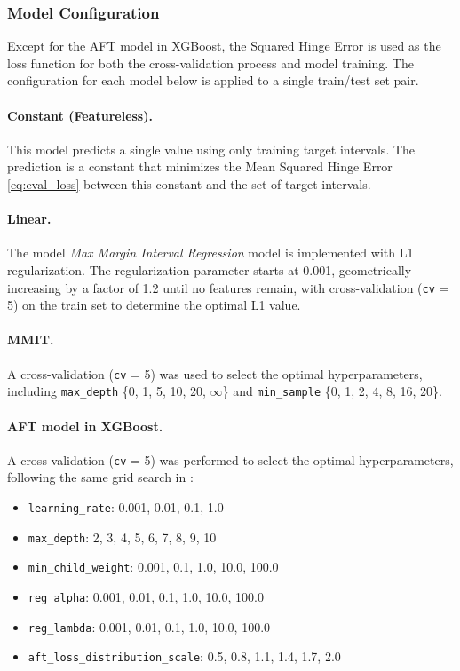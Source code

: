 \documentclass[12pt]{article}
\begin{document}
\subsubsection{Model Configuration}
Except for the AFT model in XGBoost, the Squared Hinge Error is used as the loss function for both the cross-validation process and model training.
The configuration for each model below is applied to a single train/test set pair.
\paragraph{Constant (Featureless).} 
This model predicts a single value using only training target intervals.
The prediction is a constant that minimizes the Mean Squared Hinge Error \eqref{eq:eval_loss} between this constant and the set of target intervals.
\paragraph{Linear.} 
The model \textit{Max Margin Interval Regression} model is implemented with L1 regularization.
The regularization parameter starts at 0.001, geometrically increasing by a factor of 1.2 until no features remain, with cross-validation (\texttt{cv} = 5) on the train set to determine the optimal L1 value.
\paragraph{MMIT.}  
A cross-validation (\texttt{cv} = 5) was used to select the optimal hyperparameters, including \texttt{max\_depth} \{0, 1, 5, 10, 20, \(\infty\)\} and \texttt{min\_sample} \{0, 1, 2, 4, 8, 16, 20\}.
\paragraph{AFT model in XGBoost.}
A cross-validation (\texttt{cv} = 5) was performed to select the optimal hyperparameters, following the same grid search in \citet{aft_xgboost}:
\begin{itemize}
    \item \texttt{learning\_rate}: 0.001, 0.01, 0.1, 1.0
    \item \texttt{max\_depth}: 2, 3, 4, 5, 6, 7, 8, 9, 10
    \item \texttt{min\_child\_weight}: 0.001, 0.1, 1.0, 10.0, 100.0
    \item \texttt{reg\_alpha}: 0.001, 0.01, 0.1, 1.0, 10.0, 100.0
    \item \texttt{reg\_lambda}: 0.001, 0.01, 0.1, 1.0, 10.0, 100.0
    \item \texttt{aft\_loss\_distribution\_scale}: 0.5, 0.8, 1.1, 1.4, 1.7, 2.0
\end{itemize}
\end{document}
